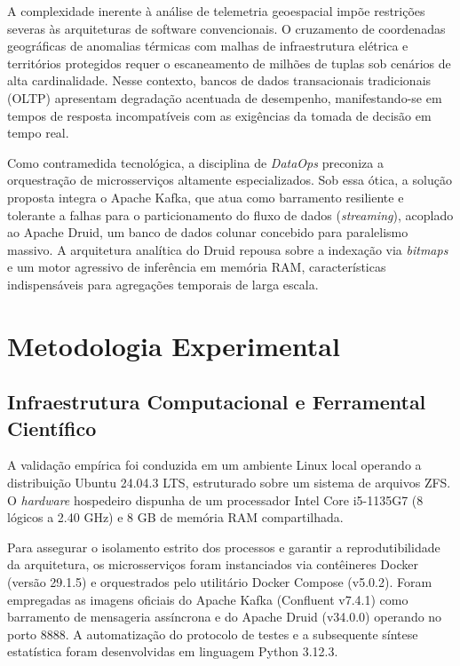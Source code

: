 \documentclass[12pt, a4paper]{article}
\begin{document}
A complexidade inerente à análise de telemetria geoespacial impõe restrições severas às arquiteturas de software convencionais. O cruzamento de coordenadas geográficas de anomalias térmicas com malhas de infraestrutura elétrica e territórios protegidos requer o escaneamento de milhões de tuplas sob cenários de alta cardinalidade. Nesse contexto, bancos de dados transacionais tradicionais (OLTP) apresentam degradação acentuada de desempenho, manifestando-se em tempos de resposta incompatíveis com as exigências da tomada de decisão em tempo real.

Como contramedida tecnológica, a disciplina de \textit{DataOps} preconiza a orquestração de microsserviços altamente especializados. Sob essa ótica, a solução proposta integra o Apache Kafka, que atua como barramento resiliente e tolerante a falhas para o particionamento do fluxo de dados (\textit{streaming}), acoplado ao Apache Druid, um banco de dados colunar concebido para paralelismo massivo. A arquitetura analítica do Druid repousa sobre a indexação via \textit{bitmaps} e um motor agressivo de inferência em memória RAM, características indispensáveis para agregações temporais de larga escala.

\section{Metodologia Experimental}

\subsection{Infraestrutura Computacional e Ferramental Científico}
A validação empírica foi conduzida em um ambiente Linux local operando a distribuição Ubuntu 24.04.3 LTS, estruturado sobre um sistema de arquivos ZFS. O \textit{hardware} hospedeiro dispunha de um processador Intel Core i5-1135G7 (8 lógicos a 2.40 GHz) e 8 GB de memória RAM compartilhada. 

Para assegurar o isolamento estrito dos processos e garantir a reprodutibilidade da arquitetura, os microsserviços foram instanciados via contêineres Docker (versão 29.1.5) e orquestrados pelo utilitário Docker Compose (v5.0.2). Foram empregadas as imagens oficiais do Apache Kafka (Confluent v7.4.1) como barramento de mensageria assíncrona e do Apache Druid (v34.0.0) operando no porto 8888. A automatização do protocolo de testes e a subsequente síntese estatística foram desenvolvidas em linguagem Python 3.12.3.
\end{document}
